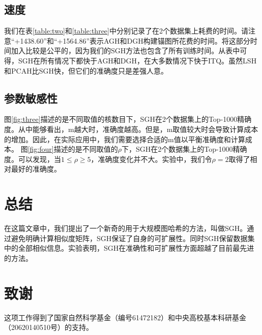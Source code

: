 \message{ !name(SGH.tex)}\documentclass[prodmode,acmtecs]{acmsmall}
\begin{document}
\subsection{速度}
我们在表\ref{table:two}和\ref{table:three}中分别记录了在2个数据集上耗费的时间。请注意“+1438.60”和“+1564.86”表示AGH和DGH构建锚图所花费的时间。将这部分时间加入比较是公平的，因为我们的SGH方法也包含了所有训练时间。从表中可得，SGH在所有情况下都快于AGH和DGH，在大多数情况下快于ITQ。虽然LSH和PCAH比SGH快，但它们的准确度只是差强人意。


\subsection{参数敏感性}
图\ref{fig:three}描述的是不同取值的核数目下，SGH在2个数据集上的Top-1000精确度。从中能够看出，m越大时，准确度越高。但是，m取值较大时会导致计算成本的增加。因此，在实际应用中，我们需要选择合适的m值以平衡准确度和计算成本。
图\ref{fig:four}描述的是不同取值的$\rho$下，SGH在2个数据集上的Top-1000精确度。可以发现，当$1 \leq \rho \geq 5$，准确度变化并不大。实验中，我们令$\rho =2$取得了相对最好的准确度。

\section{总结}
在这篇文章中，我们提出了一个新奇的用于大规模图哈希的方法，叫做SGH。通过避免明确计算相似度矩阵，SGH保证了自身的可扩展性。同时SGH保留数据集中的全部相似信息。实验表明，SGH在准确性和可扩展性方面超越了目前最先进的方法。

\section{致谢}
这项工作得到了国家自然科学基金（编号61472182）和中央高校基本科研基金（20620140510号）的支持。


\end{document}
